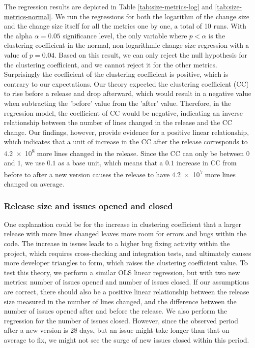 The regression results are depicted in Table \ref{tab:size-metrics-log} and \ref{tab:size-metrics-normal}. We run the regressions for both the logarithm of the change size and the change size itself for all the metrics one by one, a total of 10 runs. With the alpha $\alpha = 0.05$ significance level, the only variable where $p < \alpha$ is the clustering coefficient in the normal, non-logarithmic change size regression with a value of $p = 0.04$. Based on this result, we can only reject the null hypothesis for the clustering coefficient, and we cannot reject it for the other metrics. Surprisingly the coefficient of the clustering coefficient is positive, which is contrary to our expectations. Our theory expected the clustering coefficient (CC) to rise before a release and drop afterward, which would result in a negative value when subtracting the 'before' value from the 'after' value. Therefore, in the regression model, the coefficient of CC would be negative, indicating an inverse relationship between the number of lines changed in the release and the CC change. Our findings, however, provide evidence for a positive linear relationship, which indicates that a unit of increase in the CC after the release corresponds to \num{4.2e+8} more lines changed in the release. Since the CC can only be between $0$ and $1$, we use $0.1$ as a base unit, which means that a $0.1$ increase in CC from before to after a new version causes the release to have \num{4.2e+7} more lines changed on average.

\subsubsection{Release size and issues opened and closed}

One explanation could be for the increase in clustering coefficient that a larger release with more lines changed leaves more room for errors and bugs within the code. The increase in issues leads to a higher bug fixing activity within the project, which requires cross-checking and integration tests, and ultimately causes more developer triangles to form, which raises the clustering coefficient value. To test this theory, we perform a similar OLS linear regression, but with two new metrics: number of issues opened and number of issues closed. If our assumptions are correct, there should also be a positive linear relationship between the release size measured in the number of lines changed, and the difference between the number of issues opened after and before the release. We also perform the regression for the number of issues closed. However, since the observed period after a new version is 28 days, but an issue might take longer than that on average to fix, we might not see the surge of new issues closed within this period.

